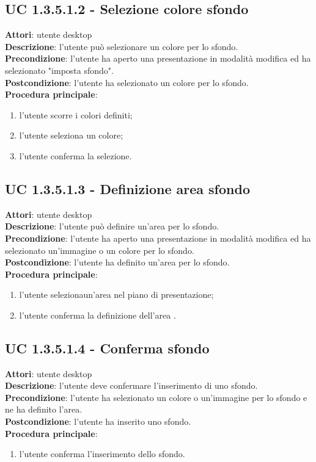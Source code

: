 \subsection{UC 1.3.5.1.2 - Selezione colore sfondo}{
	\label{uc1.3.5.1.2}
	\textbf{Attori}: utente desktop \\
	\textbf{Descrizione}: l'utente può selezionare un colore per lo sfondo. \\
	\textbf{Precondizione}: l'utente ha aperto una presentazione in modalità modifica ed ha selezionato "imposta sfondo".	\\
	\textbf{Postcondizione}: l'utente ha selezionato un colore per lo sfondo.	\\
	\textbf{Procedura principale}:
	\begin{enumerate}
		\item l'utente scorre i colori definiti;
		\item l'utente seleziona un colore;
		\item l'utente conferma la selezione.
	\end{enumerate}
}
\subsection{UC 1.3.5.1.3 - Definizione area sfondo}{
	\label{uc1.3.5.1.3}
	\textbf{Attori}: utente desktop \\
	\textbf{Descrizione}: l'utente può definire un'area per lo sfondo. \\
	\textbf{Precondizione}: l'utente ha aperto una presentazione in modalità modifica ed ha selezionato un'immagine o un colore per lo sfondo.	\\
	\textbf{Postcondizione}: l'utente ha definito un'area per lo sfondo.	\\
	\textbf{Procedura principale}:
	\begin{enumerate}
		\item l'utente selezionaun'area nel piano di presentazione;
		\item l'utente conferma la definizione dell'area .
	\end{enumerate}
}

\subsection{UC 1.3.5.1.4 - Conferma sfondo}{
	\label{uc1.3.5.1.4}
	\textbf{Attori}: utente desktop \\
	\textbf{Descrizione}: l'utente deve confermare l'inserimento di uno sfondo. \\
	\textbf{Precondizione}: l'utente ha selezionato un colore o un'immagine per lo sfondo e ne ha definito l'area.	\\
	\textbf{Postcondizione}: l'utente ha inserito uno sfondo.	\\
	\textbf{Procedura principale}:
	\begin{enumerate}
		\item l'utente conferma l'inserimento dello sfondo.
	\end{enumerate}
}
